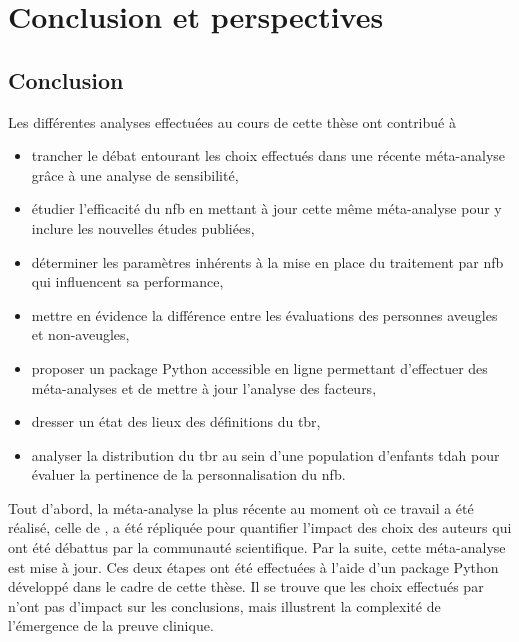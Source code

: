 \chapter{Conclusion et perspectives} \label{chapitre-5}

\section{Conclusion}

Les différentes analyses effectuées au cours de cette thèse ont contribué à 
\begin{itemize}
\item trancher le débat entourant les choix effectués dans une récente méta-analyse grâce à une analyse de sensibilité,
\item étudier l'efficacité du \gls{nfb} en mettant à jour cette même méta-analyse pour y inclure les nouvelles études publiées,
\item déterminer les paramètres inhérents à la mise en place du traitement par \gls{nfb} qui influencent sa performance,
\item mettre en évidence la différence entre les évaluations des personnes aveugles et non-aveugles,
\item proposer un package Python accessible en ligne permettant d'effectuer des méta-analyses et de mettre à jour l'analyse des facteurs,
\item dresser un état des lieux des définitions du \gls{tbr},
\item analyser la distribution du \gls{tbr} au sein d'une population d'enfants \gls{tdah} pour évaluer la pertinence 
de la personnalisation du \gls{nfb}.
\end{itemize}

Tout d'abord, la méta-analyse la plus récente au moment où ce travail a été réalisé, celle de \citet{Cortese2016}, a été répliquée 
pour quantifier l'impact des choix des auteurs qui ont été débattus par la communauté scientifique. Par la suite, cette méta-analyse est 
mise à jour. Ces deux étapes ont été effectuées à l'aide d'un package Python développé 
dans le cadre de cette thèse. Il se trouve que les choix effectués par \citet{Cortese2016} n'ont pas d'impact sur les conclusions, 
mais illustrent la complexité de l'émergence de la preuve clinique.

